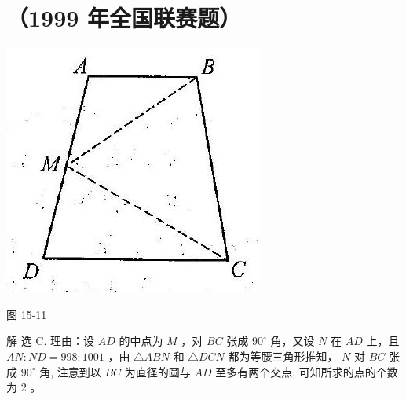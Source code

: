 \documentclass[10pt]{article}
\begin{document}
\section*{（1999 年全国联赛题）}
\begin{center}
\includegraphics[max width=\textwidth]{2024_10_30_2c8f45efd4a519b08e1ag-142}
\end{center}

图 15-11

解 选 C. 理由：设 $A D$ 的中点为 $M$ ，对 $B C$ 张成 $90^{\circ}$ 角，又设 $N$ 在 $A D$ 上，且 $A N: N D=998: 1001$ ，由 $\triangle A B N$ 和 $\triangle D C N$ 都为等腰三角形推知， $N$ 对 $B C$ 张成 $90^{\circ}$ 角, 注意到以 $B C$ 为直径的圆与 $A D$ 至多有两个交点, 可知所求的点的个数为 2 。
\end{document}
